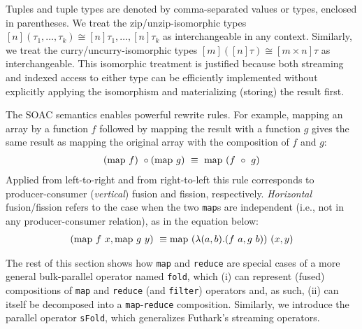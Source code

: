 Tuples and tuple types are denoted by comma-separated values or types,
enclosed in parentheses. We treat the zip/unzip-isomorphic types
$[n](\tau_1, \ldots, \tau_k) \cong [n]\tau_1 , \ldots , [n]\tau_k$ as
interchangeable in any context.  Similarly, we treat the
curry/uncurry-isomorphic types $[m]([n]\tau) \cong [m \times n]\tau$
as interchangeable.  This isomorphic treatment is justified because
both streaming and indexed access to either type can be efficiently
implemented without explicitly applying the isomorphism and
materializing (storing) the result first.
%

%

The SOAC semantics enables powerful rewrite rules.  For example,
mapping an array by a function $f$ followed by mapping the result
with a function $g$ gives the same result as mapping the original
array with the composition of $f$ and $g$:
\[ \begin{array}{l}
(\mathrm{map} ~ f) ~ \circ (\mathrm{map} ~ g) ~ \equiv ~ \mathrm{map} ~ (f ~ \circ ~ g)
\end{array} \]
Applied from left-to-right and from right-to-left this
rule corresponds to producer-consumer (\textit{vertical}) fusion and fission,
respectively.
%
\textit{Horizontal} fusion/fission refers to the case when the two
\lstinline{map}s are independent (i.e., not in any producer-consumer
relation), as in the equation below:
\[ \begin{array}{l}
(\mathrm{map} ~ f ~ x, \mathrm{map} ~ g ~ y) ~ \equiv\mathrm{map} ~ (\lambda(a,b).(f~a,g~b)) ~ (x,y)
\end{array} \]


The rest of this section shows how \lstinline{map} and
\lstinline{reduce} are special cases of a more general bulk-parallel
operator named \lstinline{fold}, which (i) can represent (fused)
compositions of \lstinline{map} and \lstinline{reduce} (and
\lstinline{filter}) operators and, as such, (ii) can itself be
decomposed into a \lstinline{map}-\lstinline{reduce} composition.
Similarly, we introduce the parallel operator \lstinline{sFold}, which
generalizes Futhark's streaming operators.


